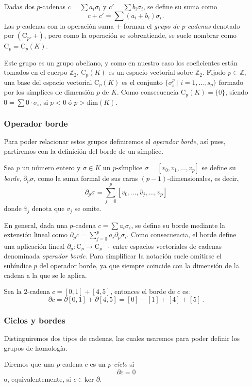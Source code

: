 Dadas dos $p$-cadenas $c = \sum a_i\sigma_i$ y $c' = \sum b_i\sigma_i$, se define su suma como
\[
c + c' = \sum (a_i + b_i)\sigma_i\,.
\]
Las $p$-cadenas con la operación suma $+$ forman el \emph{grupo de $p$-cadenas} denotado por $(\text{C}_p,+)$, pero como la operación se sobrentiende, se suele nombrar como $\text{C}_p=\text{C}_p(K)$.

Este grupo es un grupo abeliano, y como en nuestro caso los coeficientes están tomados en el cuerpo $\mathbb{Z}_2$, $\text{C}_p(K)$ es un espacio vectorial sobre $\mathbb{Z}_2$. Fijado $p \in \mathbb{Z}$, una base del espacio vectorial $\text{C}_p(K)$ es el conjunto $\{\sigma_i^p \mid i=1,...,s_p\}$ formado por los símplices de dimensión $p$ de $K$. Como consecuencia $\text{C}_p(K)=\{0\}$, siendo $0 = \sum 0\cdot\sigma_i$, si $p < 0$ ó $p > \text{dim}(K)$.

\subsubsection*{Operador borde}
Para poder relacionar estos grupos definiremos el \emph{operador borde}, así pues, partiremos con la definición del borde de un símplice.

\begin{definition}
Sea $p$ un número entero y $\sigma \in K$ un $p$-símplice $\sigma = [v_0, v_1, ..., v_p]$ se define su \emph{borde}, $\partial_p\sigma$, como la suma formal de sus caras $(p-1)$-dimensionales, es decir, 
\[
\partial_p\sigma = \sum_{j=0}^{p}[v_0, ..., \hat{v}_j, ..., v_p]
\]
donde $\hat{v}_j$ denota que $v_j$ se omite.
\end{definition}

En general, dada una $p$-cadena $c =\sum a_i\sigma_i$, se define su borde mediante la extensión lineal como  $\partial_p c= \sum_{j=0}^{p} a_i \partial_p \sigma_i$. Como consecuencia, el borde define una aplicación lineal $\partial_p: \text{C}_p \to \text{C}_{p-1}$ entre espacios vectoriales de cadenas denominada \emph{operador borde}. Para simplificar la notación suele omitirse el subíndice $p$ del operador borde, ya que siempre coincide con la dimensión de la cadena a la que se le aplica.

\begin{exmp}
Sea la $2$-cadena $c = [0,1] + [4,5]$, entonces el borde de $c$ es:
\[
\partial c = \partial [0,1] + \partial [4,5] = [0] + [1] + [4] + [5]\,.
\]
\end{exmp}

\subsubsection*{Ciclos y bordes}
Distinguiremos dos tipos de cadenas, las cuales usaremos para poder definir los grupos de homología. 
\begin{definition}
Diremos que una $p$-cadena $c$ es un \emph{$p$-ciclo} si
\[
\partial c = 0
\]
o, equivalentemente, si $c \in \text{ker }\partial$.
\end{definition}

